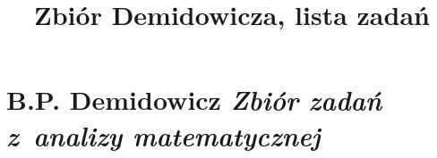 \documentclass[a4paper,11pt]{article}
\title{Zbiór Demidowicza, lista zadań}
\numberwithin{equation}{section}
\begin{document}





\maketitle





\section{B.P. Demidowicz \textit{Zbiór zadań z~analizy
    matematycznej}}

\label{sec:Oznaczenia-i-konwencje}
\end{document}
